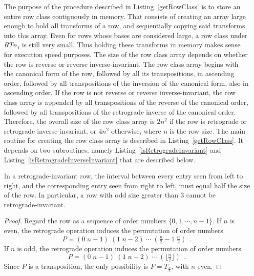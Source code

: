 The purpose of the procedure described in Listing~\ref{getRowClass} is to store an entire row class contiguously in memory. That consists of creating an array large enough to hold all transforms of a row, and sequentially copying said transforms into this array. Even for rows whose bases are considered large, a row class under $RTn_I$ is still very small. Thus holding these transforms in memory makes sense for execution speed purposes. The size of the row class array depends on whether the row is reverse or reverse inverse-invariant. The row class array begins with the canonical form of the row, followed by all its transpositions, in ascending order, followed by all transpositions of the inversion of the canonical form, also in ascending order. If the row is not reverse or reverse inverse-invariant, the row class array is appended by all transpositions of the reverse of the canonical order, followed by all transpositions of the retrograde inverse of the canonical order. Therefore, the overall size of the row class array is $2n^2$ if the row is retrograde or retrograde inverse-invariant, or $4n^2$ otherwise, where $n$ is the row size. The main routine for creating the row class array is described in Listing~\ref{getRowClass}. It depends on two subroutines, namely Listing~\ref{isRetrogradeInvariant} and Listing~\ref{isRetrogradeInverseInvariant} that are described below.

\begin{lemma}
	\label{retrograde-invariance}
	In a retrograde-invariant row, the interval between every entry seen from left to right, and the corresponding entry seen from right to left, must equal half the size of the row. In particular, a row with odd size greater than $3$ cannot be retrograde-invariant.
	\begin{proof}
	Regard the row as a sequence of order numbers $\{0, 1, \cdots, n - 1\}$. If $n$ is even, the retrograde operation induces the permutation of order numbers
	\begin{equation}
		P = (0 \; n - 1) \; (1 \; n - 2) \; \cdots \; (\tfrac{n}{2} - 1 \; \tfrac{n}{2}) \enspace .
	\end{equation}
	If $n$ is odd, the retrograde operation induces the permutation of order numbers
	\begin{equation}
		P = (0 \; n - 1) \; (1 \; n - 2) \; \cdots \; (\lfloor \tfrac{n}{2} \rfloor) \enspace .
	\end{equation}
	Since $P$ is a transposition, the only possibility is $P = T_{\frac{n}{2}}$, with $n$ even.
	\end{proof}
\end{lemma}

